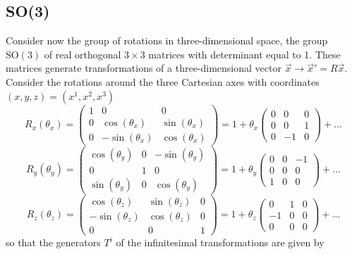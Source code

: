 \subsection{SO(3)}

Consider now the group of rotations in three-dimensional space, the group $\mathrm{SO}(3)$ of real orthogonal $3 \times 3$ matrices with determinant equal to 1. These matrices generate transformations of a three-dimensional vector $\vec{x} \rightarrow \vec{x}' = R \vec{x}$.
Consider the rotations around the three Cartesian axes with coordinates $(x, y, z) = (x^1, x^2, x^3)$
\[
    R_x(\theta_x) =
    \begin{pmatrix}
        1 & 0               & 0              \\
        0 & \cos(\theta_x)  & \sin(\theta_x) \\
        0 & -\sin(\theta_x) & \cos(\theta_x)
    \end{pmatrix}
    = 1 + \theta_x
    \begin{pmatrix}
        0 & 0  & 0 \\
        0 & 0  & 1 \\
        0 & -1 & 0
    \end{pmatrix}
    + \dots
\]
\[
    R_y(\theta_y) =
    \begin{pmatrix}
        \cos(\theta_y) & 0 & -\sin(\theta_y) \\
        0              & 1 & 0               \\
        \sin(\theta_y) & 0 & \cos(\theta_y)
    \end{pmatrix}
    = 1 + \theta_y
    \begin{pmatrix}
        0 & 0 & -1 \\
        0 & 0 & 0  \\
        1 & 0 & 0
    \end{pmatrix}
    + \dots
\]
\[
    R_z(\theta_z) =
    \begin{pmatrix}
        \cos(\theta_z)  & \sin(\theta_z) & 0 \\
        -\sin(\theta_z) & \cos(\theta_z) & 0 \\
        0               & 0              & 1
    \end{pmatrix}
    = 1 + \theta_z
    \begin{pmatrix}
        0  & 1 & 0 \\
        -1 & 0 & 0 \\
        0  & 0 & 0
    \end{pmatrix}
    + \dots
\]
so that the generators $T^i$ of the infinitesimal transformations are given by
